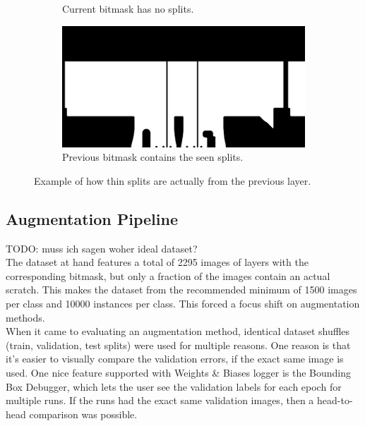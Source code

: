\begin{figure}[!h]
\begin{center}
\begin{subfigure}{0.6\textwidth}
        \caption{Current bitmask has no splits.}
    \end{subfigure}
    \begin{subfigure}{0.6\textwidth}
        \includegraphics[width=\textwidth]{images/thin_scratch_previous_layer/bitmask_00106}
        \caption{Previous bitmask contains the seen splits.}
    \end{subfigure}
            \quad

\caption{Example of how thin splits are actually from the previous layer.}
\label{fig:thin_splits_previous_layer}
\end{center}
\end{figure}


\subsection{Augmentation Pipeline}
TODO: muss ich sagen woher ideal dataset? \\
The dataset at hand features a total of 2295 images of layers with the corresponding bitmask, but only a fraction of the images contain an actual scratch. This makes the dataset from the recommended minimum of 1500 images per class and 10000 instances per class. This forced a focus shift on augmentation methods. \\
When it came to evaluating an augmentation method, identical dataset shuffles (train, validation, test splits) were used for multiple reasons. One reason is that it's easier to visually compare the validation errors, if the exact same image is used. One nice feature supported with Weights \& Biases logger is the Bounding Box Debugger, which lets the user see the validation labels for each epoch for multiple runs. If the runs had the exact same validation images, then a head-to-head comparison was possible.\\

